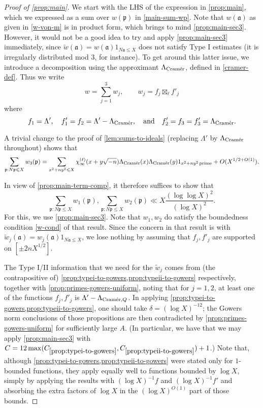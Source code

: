 \documentclass[11pt,reqno]{amsart}
\numberwithin{equation}{section}
\theoremstyle{definition}
\theoremstyle{remark}
\newcommand{\mf}{\mathfrak}
\renewcommand{\le}{\leqslant}
\newcommand\cramer{{\textnormal{Cram\'er}}}
\newcommand\qq{Q}
\begin{document}
\begin{proof}[Proof of \cref{prop:main}]
We start with the LHS of the expression in \cref{prop:main}, which we expressed as a sum over $w(\mf{p})$ in \cref{main-sum-wp}. Note that $w(\mf{a})$ as given in \cref{w-von-m} is in product form, which brings to mind \cref{prop:main-sec3}. However, it would not be a good idea to try and apply \cref{prop:main-sec3} immediately, since $\tilde w(\mf{a}) = w(\mf{a}) 1_{N\mf{a} \le X}$ does not satisfy Type I estimates (it is irregularly distributed mod 3, for instance). To get around this latter issue, we introduce a decomposition using the approximant $\Lambda_{\cramer}$, defined in \cref{cramer-def}. Thus we write
\begin{equation}\label{w-decomp} w = \sum_{j=1}^3 w_j, \qquad w_j = f_j \boxtimes_{\ell} f'_j \end{equation}
where 
\begin{equation}\label{fj-choices} f_1 = \Lambda', \quad f'_1 = f_2 = \Lambda' - \Lambda_{\cramer}, \quad  \mbox{and} \quad f'_2 = f_3 = f'_3 = \Lambda_{\cramer}.\end{equation}
 

A trivial change to the proof of \cref{lem:sums-to-ideals} (replacing $\Lambda'$ by $\Lambda_{\cramer}$ throughout) shows that 
\[ \sum_{\mf{p} : N\mf{p} \le X} w_3(\mf{p}) = \sum_{x^2 + ny^2 \le X}\chi_{\infty}^{(\ell)}(x + y \sqrt{-n})\Lambda_{\cramer}(x)\Lambda_{\cramer}(y)1_{x^2 + ny^2 \operatorname{prime}}  + O(X^{1/2 + O(1)}).\]

In view of \cref{prop:main-term-comp}, it therefore suffices to show that 
\begin{equation}\label{suff-w1w2} \sum_{\mf{p} : N\mf{p} \le X} w_1(\mf{p}), \sum_{\mf{p}: N\mf{p} \le X} w_2 (\mf{p}) \ll X \frac{(\log \log X)^{2}}{(\log X)^2}.\end{equation}
For this, we use \cref{prop:main-sec3}. Note that $w_1, w_2$ do satisfy the boundedness condition \cref{w-cond} of that result. Since the concern in that result is with $\tilde w_j(\mf{a}) = w_j(\mf{a}) 1_{N\mf{a} \le X}$, we lose nothing by assuming that $f_j, f'_j$ are supported on $[\pm 2n X^{1/2}]$.

The Type I/II information that we need for the $\tilde w_j$ comes from (the contrapositive of) \cref{prop:typei-to-gowers,prop:typeii-to-gowers} respectively, together with \cref{prop:primes-gowers-uniform}, noting that for $j = 1,2$, at least one of the functions $f_j, f'_j$ is $\Lambda' - \Lambda_{\cramer, \qq}$. In applying \cref{prop:typei-to-gowers,prop:typeii-to-gowers}, one should take $\delta = (\log X)^{-12}$; the Gowers norm conclusions of those propositions are then contradicted by \cref{prop:primes-gowers-uniform} for sufficiently large $A$. (In particular, we have that we may apply \cref{prop:main-sec3} with $C = 12\max(C_{\ref{prop:typei-to-gowers}},C_{\ref{prop:typeii-to-gowers}}) + 1$.)
Note that, although \cref{prop:typei-to-gowers,prop:typeii-to-gowers} were stated only for $1$-bounded functions, they apply equally well to functions bounded by $\log X$, simply by applying the results with $(\log X)^{-1} f$ and $(\log X)^{-1} f'$ and absorbing the extra factors of $\log X$ in the $(\log X)^{O(1)}$ part of those bounds.


\end{proof}
\end{document}

